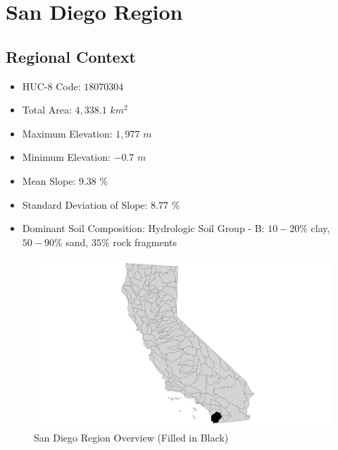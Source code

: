 \clearpage    
    
\section{San Diego Region}

    \subsection{Regional Context}
    
    \begin{itemize}
      \setlength{\itemsep}{0cm}
      \setlength{\parskip}{0cm}
        \item HUC-8 Code: $18070304$
        \item Total Area: $4,338.1$ $km^2$
        \item Maximum Elevation: $1,977$ $m$
        \item Minimum Elevation: $-0.7$ $m$
        \item Mean Slope: $9.38$ $\%$
        \item Standard Deviation of Slope: $8.77$ $\%$
        \item Dominant Soil Composition: Hydrologic Soil Group - B: $10-20\%$ clay, $50-90\%$ sand, $35\%$ rock fragments
    \end{itemize}
    
        \begin{figure}[!h]
            \begin{center}
            \includegraphics[width=5.5in]{figures/SanDiego_Overview.png}   
            \caption{San Diego Region Overview (Filled in Black)}
            \label{fig:SDoverview}
            \end{center}
        \end{figure}

